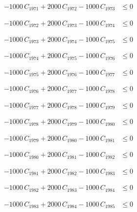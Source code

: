 \documentclass[a4paper,11pt]{article}
\begin{document}
\begin{align}
-1000\,C_{1971} + 2000\,C_{1972} - 1000\,C_{1973} &\leq 0 \nonumber
\end{align}

\begin{align}
-1000\,C_{1972} + 2000\,C_{1973} - 1000\,C_{1974} &\leq 0 \nonumber
\end{align}

\begin{align}
-1000\,C_{1973} + 2000\,C_{1974} - 1000\,C_{1975} &\leq 0 \nonumber
\end{align}

\begin{align}
-1000\,C_{1974} + 2000\,C_{1975} - 1000\,C_{1976} &\leq 0 \nonumber
\end{align}

\begin{align}
-1000\,C_{1975} + 2000\,C_{1976} - 1000\,C_{1977} &\leq 0 \nonumber
\end{align}

\begin{align}
-1000\,C_{1976} + 2000\,C_{1977} - 1000\,C_{1978} &\leq 0 \nonumber
\end{align}

\begin{align}
-1000\,C_{1977} + 2000\,C_{1978} - 1000\,C_{1979} &\leq 0 \nonumber
\end{align}

\begin{align}
-1000\,C_{1978} + 2000\,C_{1979} - 1000\,C_{1980} &\leq 0 \nonumber
\end{align}

\begin{align}
-1000\,C_{1979} + 2000\,C_{1980} - 1000\,C_{1981} &\leq 0 \nonumber
\end{align}

\begin{align}
-1000\,C_{1980} + 2000\,C_{1981} - 1000\,C_{1982} &\leq 0 \nonumber
\end{align}

\begin{align}
-1000\,C_{1981} + 2000\,C_{1982} - 1000\,C_{1983} &\leq 0 \nonumber
\end{align}

\begin{align}
-1000\,C_{1982} + 2000\,C_{1983} - 1000\,C_{1984} &\leq 0 \nonumber
\end{align}

\begin{align}
-1000\,C_{1983} + 2000\,C_{1984} - 1000\,C_{1985} &\leq 0 \nonumber
\end{align}
\end{document}

